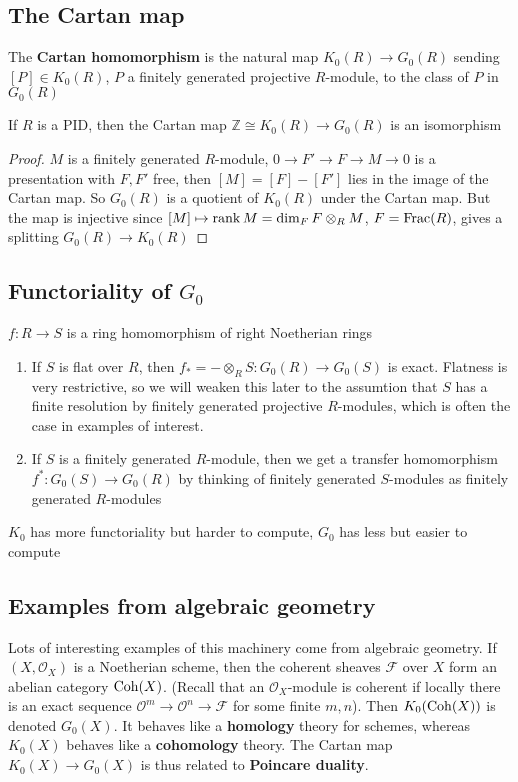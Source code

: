 \documentclass[main]{subfiles}
\begin{document}
\subsection{The Cartan map}

The \textbf{Cartan homomorphism} is the natural map $K_0(R)\to G_0(R)$ sending $[P]\in K_0(R)$, $P$ a finitely generated projective $R$-module, to the class of $P$ in $G_0(R)$

\begin{proposition}
If $R$ is a PID, then the Cartan map $\mathbb Z\cong K_0(R)\to G_0(R)$ is an isomorphism
\end{proposition}

\begin{proof}
$M$ is a finitely generated $R$-module, $0\to F'\to F\to M\to0$ is a presentation with $F,F'$ free, then $[M]=[F]-[F']$ lies in the image of the Cartan map. So $G_0(R)$ is a quotient of $K_0(R)$ under the Cartan map. But the map is injective since $[M]\mapsto \operatorname{rank} M=\dim_FF\otimes_RM$, $F=\operatorname{Frac}(R)$, gives a splitting $G_0(R)\to K_0(R)$
\end{proof}

\subsection{Functoriality of $G_0$}
$f:R\to S$ is a ring homomorphism of right Noetherian rings
\begin{enumerate}[label=\alph*)]
\item If $S$ is flat over $R$, then $f_*=-\otimes_R S:G_0(R)\to G_0(S)$ is exact. Flatness is very restrictive, so we will weaken this later to the assumtion that $S$ has a finite resolution by finitely generated projective $R$-modules, which is often the case in examples of interest.
\item If $S$ is a finitely generated $R$-module, then we get a transfer homomorphism $f^*:G_0(S)\to G_0(R)$ by thinking of finitely generated $S$-modules as finitely generated $R$-modules
\end{enumerate}

$K_0$ has more functoriality but harder to compute, $G_0$ has less but easier to compute

\subsection{Examples from algebraic geometry}

Lots of interesting examples of this machinery come from algebraic geometry. If $(X,\mathcal O_X)$ is a Noetherian scheme, then the coherent sheaves $\mathcal F$ over $X$ form an abelian category $\operatorname{Coh}(X)$. (Recall that an $\mathcal O_X$-module is coherent if locally there is an exact sequence $\mathcal O^m\to\mathcal O^n\to\mathcal F$ for some finite $m,n$). Then $K_0(\operatorname{Coh}(X))$ is denoted $G_0(X)$. It behaves like a \textbf{homology} theory for schemes, whereas $K_0(X)$ behaves like a \textbf{cohomology} theory. The Cartan map $K_0(X)\to G_0(X)$ is thus related to \textbf{Poincare duality}.
\end{document}
